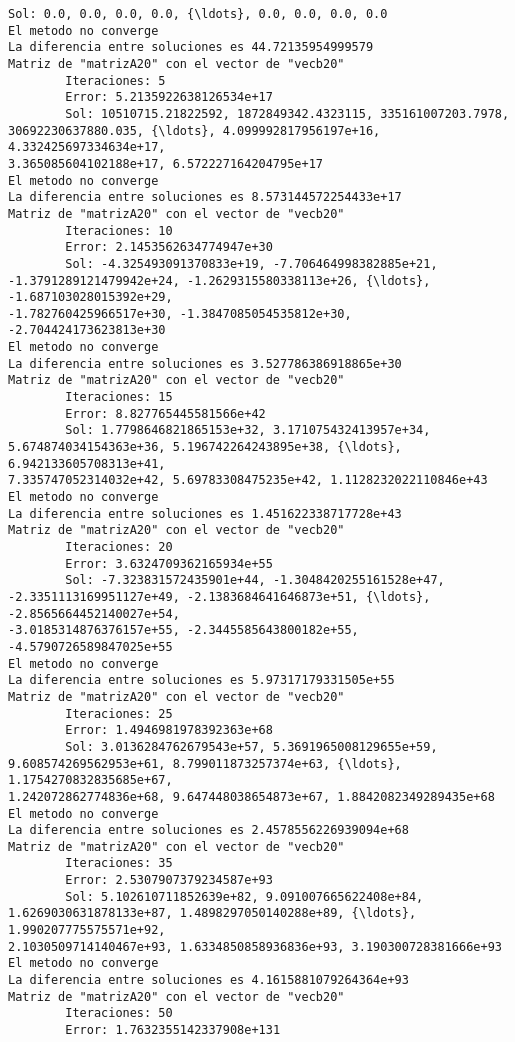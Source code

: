 \documentclass[11pt]{article}
\begin{document}
\begin{Verbatim}[commandchars=\\\{\}]
        Sol: 0.0, 0.0, 0.0, 0.0, {\ldots}, 0.0, 0.0, 0.0, 0.0
El metodo no converge
La diferencia entre soluciones es 44.72135954999579
Matriz de "matrizA20" con el vector de "vecb20"
        Iteraciones: 5
        Error: 5.2135922638126534e+17
        Sol: 10510715.21822592, 1872849342.4323115, 335161007203.7978,
30692230637880.035, {\ldots}, 4.099992817956197e+16, 4.332425697334634e+17,
3.365085604102188e+17, 6.572227164204795e+17
El metodo no converge
La diferencia entre soluciones es 8.573144572254433e+17
Matriz de "matrizA20" con el vector de "vecb20"
        Iteraciones: 10
        Error: 2.1453562634774947e+30
        Sol: -4.325493091370833e+19, -7.706464998382885e+21,
-1.3791289121479942e+24, -1.2629315580338113e+26, {\ldots}, -1.687103028015392e+29,
-1.782760425966517e+30, -1.3847085054535812e+30, -2.704424173623813e+30
El metodo no converge
La diferencia entre soluciones es 3.527786386918865e+30
Matriz de "matrizA20" con el vector de "vecb20"
        Iteraciones: 15
        Error: 8.827765445581566e+42
        Sol: 1.7798646821865153e+32, 3.171075432413957e+34,
5.674874034154363e+36, 5.196742264243895e+38, {\ldots}, 6.942133605708313e+41,
7.335747052314032e+42, 5.69783308475235e+42, 1.1128232022110846e+43
El metodo no converge
La diferencia entre soluciones es 1.451622338717728e+43
Matriz de "matrizA20" con el vector de "vecb20"
        Iteraciones: 20
        Error: 3.6324709362165934e+55
        Sol: -7.323831572435901e+44, -1.3048420255161528e+47,
-2.3351113169951127e+49, -2.1383684641646873e+51, {\ldots}, -2.8565664452140027e+54,
-3.0185314876376157e+55, -2.3445585643800182e+55, -4.5790726589847025e+55
El metodo no converge
La diferencia entre soluciones es 5.97317179331505e+55
Matriz de "matrizA20" con el vector de "vecb20"
        Iteraciones: 25
        Error: 1.4946981978392363e+68
        Sol: 3.0136284762679543e+57, 5.3691965008129655e+59,
9.608574269562953e+61, 8.799011873257374e+63, {\ldots}, 1.1754270832835685e+67,
1.242072862774836e+68, 9.647448038654873e+67, 1.8842082349289435e+68
El metodo no converge
La diferencia entre soluciones es 2.4578556226939094e+68
Matriz de "matrizA20" con el vector de "vecb20"
        Iteraciones: 35
        Error: 2.5307907379234587e+93
        Sol: 5.102610711852639e+82, 9.091007665622408e+84,
1.6269030631878133e+87, 1.4898297050140288e+89, {\ldots}, 1.990207775575571e+92,
2.1030509714140467e+93, 1.6334850858936836e+93, 3.190300728381666e+93
El metodo no converge
La diferencia entre soluciones es 4.1615881079264364e+93
Matriz de "matrizA20" con el vector de "vecb20"
        Iteraciones: 50
        Error: 1.7632355142337908e+131

\end{Verbatim}
\end{document}

